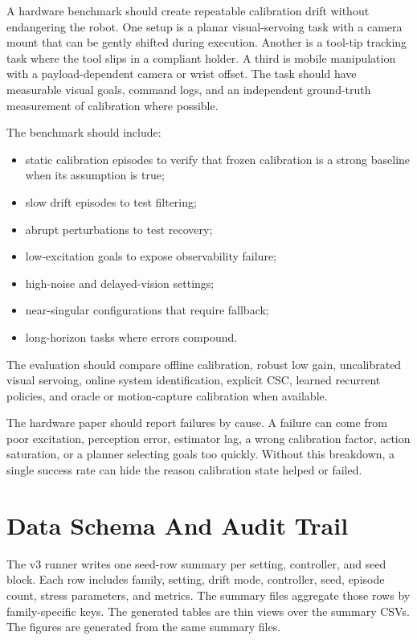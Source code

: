 \documentclass{article}
\begin{document}
A hardware benchmark should create repeatable calibration drift without
endangering the robot. One setup is a planar visual-servoing task with a camera
mount that can be gently shifted during execution. Another is a tool-tip
tracking task where the tool slips in a compliant holder. A third is mobile
manipulation with a payload-dependent camera or wrist offset. The task should
have measurable visual goals, command logs, and an independent ground-truth
measurement of calibration where possible.

The benchmark should include:
\begin{itemize}[leftmargin=*]
\item static calibration episodes to verify that frozen calibration is a strong
baseline when its assumption is true;
\item slow drift episodes to test filtering;
\item abrupt perturbations to test recovery;
\item low-excitation goals to expose observability failure;
\item high-noise and delayed-vision settings;
\item near-singular configurations that require fallback;
\item long-horizon tasks where errors compound.
\end{itemize}
The evaluation should compare offline calibration, robust low gain,
uncalibrated visual servoing, online system identification, explicit CSC,
learned recurrent policies, and oracle or motion-capture calibration when
available.

The hardware paper should report failures by cause. A failure can come from
poor excitation, perception error, estimator lag, a wrong calibration factor,
action saturation, or a planner selecting goals too quickly. Without this
breakdown, a single success rate can hide the reason calibration state helped
or failed.

\section{Data Schema And Audit Trail}

The v3 runner writes one seed-row summary per setting, controller, and seed
block. Each row includes family, setting, drift mode, controller, seed,
episode count, stress parameters, and metrics. The summary files aggregate
those rows by family-specific keys. The generated tables are thin views over
the summary CSVs. The figures are generated from the same summary files.
\end{document}

